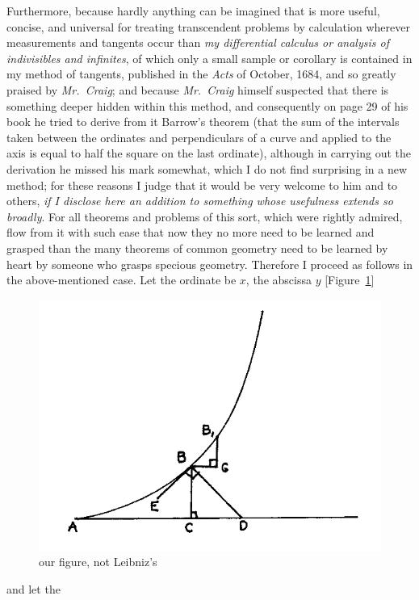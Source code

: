\documentclass[polutonikogreek,english,twoside,openright]{article}
\begin{document}
Furthermore, because hardly anything\label{hardany} can be imagined
that is more useful, concise, and universal for treating transcendent
problems by calculation wherever measurements and tangents occur than
{\em my differential calculus or analysis of indivisibles and
  infinites}, of which only a small sample or corollary is contained
in my method of tangents, published in the {\em Acts} of October,
1684, and so greatly praised by {\em Mr.\ Craig}; and because {\em
  Mr.\ Craig} himself suspected that there is something deeper hidden
within this method, and consequently on page 29 of his book he tried
to derive from it Barrow's theorem (that the sum of the intervals
taken between the ordinates and perpendiculars of a curve and applied
to the axis is equal to half the square on the last
ordinate), although in
carrying out the derivation he missed his mark somewhat, which I do
not find surprising in a new method; for these reasons I judge that it
would be very welcome to him and to others, {\em if I disclose here an
  addition to something whose usefulness extends so broadly}.  For all
theorems and problems of this sort, which were rightly admired, flow
from it with such ease that now they no more need to be learned and
grasped than the many theorems of common geometry need to be learned
by heart by someone who grasps specious geometry. Therefore I proceed as follows in the
above-mentioned case.  Let the ordinate be $x$, the abscissa $y$
[Figure~\ref{barrow1}]
\begin{figure}[htp]
\begin{center}
\includegraphics[width=.75\textwidth]{fig/Figure40}
\caption{our figure, not Leibniz's}
\label{barrow1}
\end{center}
\end{figure}  and let the
\end{document}
